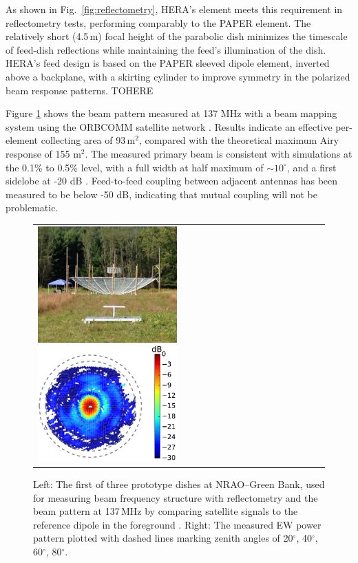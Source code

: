 \documentclass[preprint,11pt]{aastex}
\newcommand{\Mycitep}[1]{\citep{#1}}
\begin{document}
As shown in Fig.~\ref{fig:reflectometry}, HERA's element meets this requirement in
reflectometry tests, performing comparably to the PAPER element.  The
relatively short (4.5\,m) focal height of the parabolic dish 
minimizes the timescale of feed-dish reflections while maintaining the feed's
illumination of the dish.  HERA's feed design is based on the PAPER sleeved
dipole element, inverted above a backplane, with a skirting cylinder to
improve symmetry in the polarized beam response patterns.  
TOHERE

Figure
\ref{fig:orbcommexptandbeammap} shows the beam pattern measured at 137 MHz with a beam mapping
system using the ORBCOMM satellite network \Mycitep{neben_et_al2016}.  Results
indicate an effective per-element collecting area of 93\,m$^2$, compared with the
theoretical maximum Airy response of 155 m$^2$.  The measured primary beam is
consistent with simulations at the 0.1\% to 0.5\% level, with a full width at
half maximum of $\sim$$10^\circ$, and a first sidelobe at -20 dB \citep{ewallwice_et_al2016,neben_et_al2016,patra_et_al2016,thyagarajan_et_al2016}.
Feed-to-feed coupling between adjacent antennas has been measured to be below -50 dB, indicating
that mutual coupling will not be problematic.

\begin{figure}[h!]
	\begin{tabular}{ll}
	\begin{minipage}{4.2in}
\includegraphics[width=2.1in]{plots/ref_dipole_and_hera_dish.jpg}
\includegraphics[width=2.1in]{plots/orbcomm_dish_beam_map_530cm_feed.pdf}
	\end{minipage} & 
	\begin{minipage}{2.05in}
	\caption{Left: The first of three prototype dishes at NRAO--Green Bank, used for measuring beam frequency structure with reflectometry and the beam pattern at 137\,MHz by comparing satellite signals to the reference dipole in the foreground \citep{neben_et_al2016}. Right: The measured EW power pattern plotted with dashed lines marking zenith angles of 20$^\circ$, 40$^\circ$, 60$^\circ$, 80$^\circ$.} 
	\label{fig:orbcommexptandbeammap}
	\end{minipage}
	\end{tabular}
	\vspace{-15pt}
\end{figure}
\end{document}
